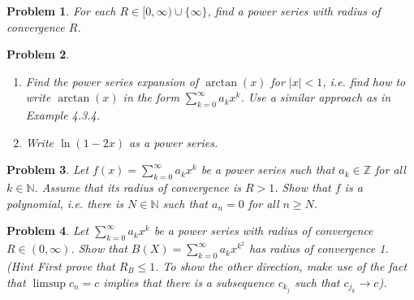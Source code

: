 \documentclass[11pt,oneside]{article}
\newtheorem{prob}{Problem}
\begin{document}
\begin{prob}
	For each $R\in[0,\infty)\cup\{\infty\}$, find a power series with radius of convergence $R$.
\end{prob}

\begin{prob}
	\begin{enumerate}
		\item Find the power series expansion of $\arctan(x)$ for $|x|<1$, i.e. find how to write $\arctan(x)$ in the 
			form $\sum_{k=0}^{\infty}a_kx^k$. Use a similar approach as in Example 4.3.4.
		\item Write $\ln(1-2x)$ as a power series.
	\end{enumerate}
\end{prob}

\begin{prob}%
	Let $f(x)=\sum_{k=0}^{\infty}a_kx^k$ be a power series such that $a_k\in\mathbb Z$ for all $k\in\mathbb N$. Assume that its 
	radius of convergence is $R>1$. Show that $f$ is a polynomial, i.e. there is $N\in\mathbb N$ such that $a_n=0$ for all $n\ge N$. 
\end{prob}

\begin{prob}
	Let $\sum_{k=0}^{\infty}a_kx^k$ be a power series with radius of convergence $R\in(0,\infty)$. Show that 
	$B(X)=\sum_{k=0}^{\infty}a_kx^{k^2}$ has radius of convergence 1.
	{\it (Hint First prove that $R_B\le 1$. To show the other direction, make use of the fact that $\limsup c_n=c$ implies that
	there is a subsequence $c_{k_j}$ such that $c_{j_k}\rightarrow c$)}.
\end{prob}
\end{document}
